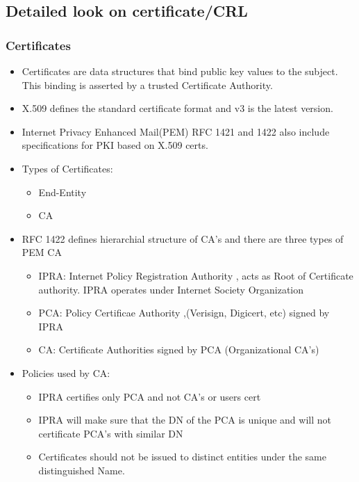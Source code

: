 \documentclass[a4paper]{article}
\begin{document}
\subsection{Detailed look on certificate/CRL}
    \subsubsection {Certificates}
        \begin{itemize}
            \item Certificates are data structures that bind public key values to the subject. This binding is asserted by a trusted Certificate Authority.
            \item X.509 defines the standard certificate format and v3 is the latest version.
            \item Internet Privacy Enhanced Mail(PEM) RFC 1421 and 1422 also include specifications for PKI based on X.509 certs. 
            \item Types of Certificates:
                \begin{itemize}
                    \item End-Entity
                    \item CA
                \end{itemize}
            \item RFC 1422 defines hierarchial structure  of CA's and there are three types of PEM CA
                \begin{itemize}
                    \item IPRA: Internet Policy Registration Authority , acts as Root of Certificate authority. IPRA operates under Internet Society Organization
                    \item PCA: Policy Certificae Authority ,(Verisign, Digicert, etc) signed by IPRA
                    \item CA: Certificate Authorities signed by PCA (Organizational CA's)
                \end{itemize}
            \item Policies used by CA:
                \begin{itemize}
                    \item IPRA certifies only PCA and not CA's or users cert
                    \item IPRA will make sure that the DN of the PCA is unique and will not certificate PCA's with similar DN
                    \item Certificates should not be issued to distinct entities under the same distinguished Name. 

\end{itemize}
\end{itemize}
\end{document}
